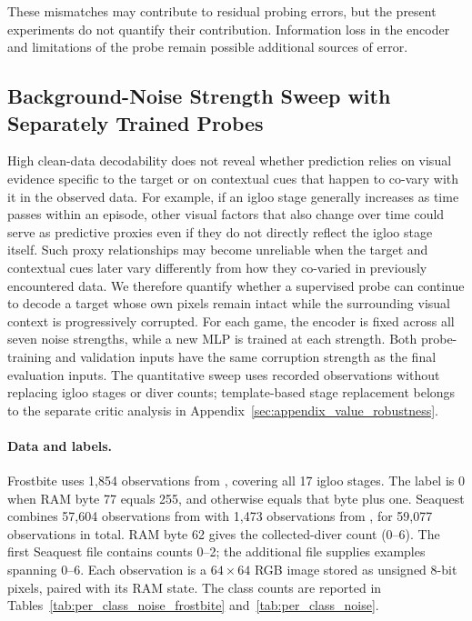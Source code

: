 \documentclass{article} %
\begin{document}
These mismatches may contribute to residual probing errors, but the present experiments do not quantify their contribution. Information loss in the encoder and limitations of the probe remain possible additional sources of error.

\subsection{Background-Noise Strength Sweep with Separately Trained Probes}
\label{subsec:appendix_noise_sweep}
High clean-data decodability does not reveal whether prediction relies on visual evidence specific to the target or on contextual cues that happen to co-vary with it in the observed data. For example, if an igloo stage generally increases as time passes within an episode, other visual factors that also change over time could serve as predictive proxies even if they do not directly reflect the igloo stage itself. Such proxy relationships may become unreliable when the target and contextual cues later vary differently from how they co-varied in previously encountered data. We therefore quantify whether a supervised probe can continue to decode a target whose own pixels remain intact while the surrounding visual context is progressively corrupted. For each game, the encoder is fixed across all seven noise strengths, while a new MLP is trained at each strength. Both probe-training and validation inputs have the same corruption strength as the final evaluation inputs. The quantitative sweep uses recorded observations without replacing igloo stages or diver counts; template-based stage replacement belongs to the separate critic analysis in Appendix~\ref{sec:appendix_value_robustness}.

\paragraph{Data and labels.}
Frostbite uses 1,854 observations from , covering all 17 igloo stages. The label is 0 when RAM byte 77 equals 255, and otherwise equals that byte plus one. Seaquest combines 57,604 observations from  with 1,473 observations from , for 59,077 observations in total. RAM byte 62 gives the collected-diver count (0--6). The first Seaquest file contains counts 0--2; the additional file supplies examples spanning 0--6. Each observation is a $64\times64$ RGB image stored as unsigned 8-bit pixels, paired with its RAM state. The class counts are reported in Tables~\ref{tab:per_class_noise_frostbite} and~\ref{tab:per_class_noise}.
\end{document}
